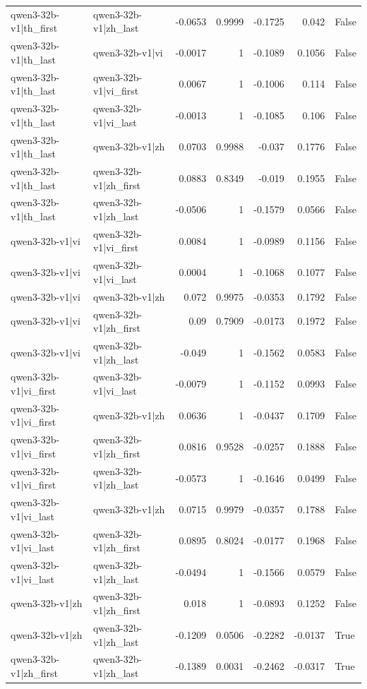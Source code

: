 \begin{table}
\begin{tabular}{l l r r r r l}
qwen3-32b-v1|th_first & qwen3-32b-v1|zh_last & -0.0653 & 0.9999 & -0.1725 & 0.042 & False \\
qwen3-32b-v1|th_last & qwen3-32b-v1|vi & -0.0017 & 1 & -0.1089 & 0.1056 & False \\
qwen3-32b-v1|th_last & qwen3-32b-v1|vi_first & 0.0067 & 1 & -0.1006 & 0.114 & False \\
qwen3-32b-v1|th_last & qwen3-32b-v1|vi_last & -0.0013 & 1 & -0.1085 & 0.106 & False \\
qwen3-32b-v1|th_last & qwen3-32b-v1|zh & 0.0703 & 0.9988 & -0.037 & 0.1776 & False \\
qwen3-32b-v1|th_last & qwen3-32b-v1|zh_first & 0.0883 & 0.8349 & -0.019 & 0.1955 & False \\
qwen3-32b-v1|th_last & qwen3-32b-v1|zh_last & -0.0506 & 1 & -0.1579 & 0.0566 & False \\
qwen3-32b-v1|vi & qwen3-32b-v1|vi_first & 0.0084 & 1 & -0.0989 & 0.1156 & False \\
qwen3-32b-v1|vi & qwen3-32b-v1|vi_last & 0.0004 & 1 & -0.1068 & 0.1077 & False \\
qwen3-32b-v1|vi & qwen3-32b-v1|zh & 0.072 & 0.9975 & -0.0353 & 0.1792 & False \\
qwen3-32b-v1|vi & qwen3-32b-v1|zh_first & 0.09 & 0.7909 & -0.0173 & 0.1972 & False \\
qwen3-32b-v1|vi & qwen3-32b-v1|zh_last & -0.049 & 1 & -0.1562 & 0.0583 & False \\
qwen3-32b-v1|vi_first & qwen3-32b-v1|vi_last & -0.0079 & 1 & -0.1152 & 0.0993 & False \\
qwen3-32b-v1|vi_first & qwen3-32b-v1|zh & 0.0636 & 1 & -0.0437 & 0.1709 & False \\
qwen3-32b-v1|vi_first & qwen3-32b-v1|zh_first & 0.0816 & 0.9528 & -0.0257 & 0.1888 & False \\
qwen3-32b-v1|vi_first & qwen3-32b-v1|zh_last & -0.0573 & 1 & -0.1646 & 0.0499 & False \\
qwen3-32b-v1|vi_last & qwen3-32b-v1|zh & 0.0715 & 0.9979 & -0.0357 & 0.1788 & False \\
qwen3-32b-v1|vi_last & qwen3-32b-v1|zh_first & 0.0895 & 0.8024 & -0.0177 & 0.1968 & False \\
qwen3-32b-v1|vi_last & qwen3-32b-v1|zh_last & -0.0494 & 1 & -0.1566 & 0.0579 & False \\
qwen3-32b-v1|zh & qwen3-32b-v1|zh_first & 0.018 & 1 & -0.0893 & 0.1252 & False \\
qwen3-32b-v1|zh & qwen3-32b-v1|zh_last & -0.1209 & 0.0506 & -0.2282 & -0.0137 & True \\
qwen3-32b-v1|zh_first & qwen3-32b-v1|zh_last & -0.1389 & 0.0031 & -0.2462 & -0.0317 & True \\
\bottomrule
\end{tabular}
\end{table}

